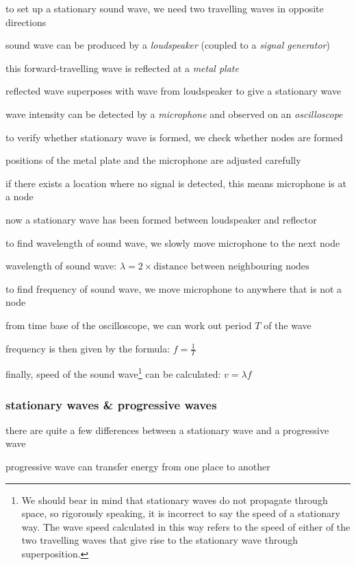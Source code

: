 \cmt to set up a stationary sound wave, we need two travelling waves in opposite directions

sound wave can be produced by a \emph{loudspeaker} (coupled to a \emph{signal generator})

this forward-travelling wave is reflected at a \emph{metal plate}

reflected wave superposes with wave from loudspeaker to give a stationary wave

wave intensity can be detected by a \emph{microphone} and observed on an \emph{oscilloscope}

\cmt to verify whether stationary wave is formed, we check whether nodes are formed

positions of the metal plate and the microphone are adjusted carefully

if there exists a location where no signal is detected, this means microphone is at a node

now a stationary wave has been formed between loudspeaker and reflector

\cmt to find wavelength of sound wave, we slowly move microphone to the next node

wavelength of sound wave: $\lambda = 2\times \text{distance between neighbouring nodes}$

\cmt to find frequency of sound wave, we move microphone to anywhere that is not a node

from time base of the oscilloscope, we can work out period $T$ of the wave

frequency is then given by the formula: $f=\frac{1}{T}$

\cmt finally,  speed of the sound wave\footnote{We should bear in mind that stationary waves do not propagate through space, so rigorously speaking, it is incorrect to say the speed of a stationary way. The wave speed calculated in this way refers to the speed of either of the two travelling waves that give rise to the stationary wave through superposition.} can be calculated: $v=\lambda f$




\subsubsection{stationary waves \& progressive waves}

there are quite a few differences between a stationary wave and a progressive wave

\cmt progressive wave can transfer energy from one place to another

